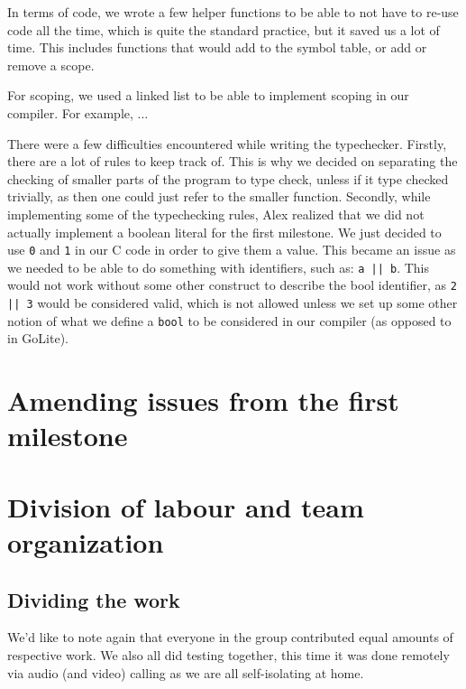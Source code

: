 \documentclass{article}
\begin{document}
In terms of code, we wrote a few helper functions to be able to not have to
re-use code all the time, which is quite the standard practice, but it saved
us a lot of time. This includes functions that would add to the symbol table, or
add or remove a scope.

For scoping, we used a linked list to be able to implement scoping in our compiler.
For example, ... %

There were a few difficulties encountered while writing the typechecker. Firstly,
there are a lot of rules to keep track of. This is why we decided on separating
the checking of smaller parts of the program to type check, unless if it type
checked trivially, as then one could just refer to the smaller function.
Secondly, while implementing some of the typechecking rules, Alex realized that
we did not actually implement a boolean literal for the first milestone. We
just decided to use \verb$0$ and \verb$1$ in our C code in order to give them
a value. This became an issue as we needed to be able to do something with
identifiers, such as: \verb$a || b$. This would not work without some other
construct to describe the bool identifier, as \verb$2 || 3$ would be considered
valid, which is not allowed unless we set up some other notion of what we
define a \verb$bool$ to be considered in our compiler (as opposed to in GoLite).


\section{Amending issues from the first milestone}



\section{Division of labour and team organization}

\subsection{Dividing the work}

 We'd like to note again that everyone in the group contributed equal amounts of
 respective work. We also all did testing together, this time it was done
 remotely via audio (and video) calling as we are all self-isolating at home.
\end{document}

